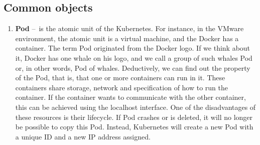 \subsection{Common objects}
\label{objects}

\begin{enumerate}[itemsep=1mm, parsep=0pt]
    \item \textbf{Pod} \---\ is the atomic unit of the Kubernetes. For instance, in the VMware environment, the atomic unit is a virtual machine, and the Docker has a container. The term Pod originated from the Docker logo. If we think about it, Docker has one whale on his logo, and we call a group of such whales Pod or, in other words, Pod of whales. Deductively, we can find out the property of the Pod, that is, that one or more containers can run in it. These containers share storage, network and specification of how to run the container. If the container wants to communicate with the other container, this can be achieved using the localhost interface. One of the disadvantages of these resources is their lifecycle. If Pod crashes or is deleted, it will no longer be possible to copy this Pod. Instead, Kubernetes will create a new Pod with a unique ID and a new IP address assigned.
    

\end{enumerate}
